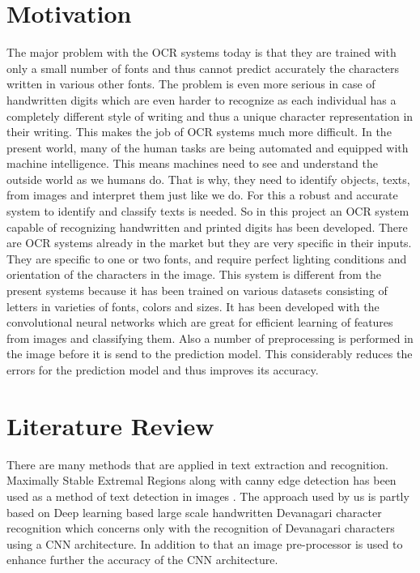 \section{Motivation}
The major problem with the OCR systems today is that they are trained with only a small number of fonts and thus cannot predict accurately the characters written in various other fonts. The problem is even more serious in case of handwritten digits which are even harder to recognize as each individual has a completely different style of writing and thus a unique character representation in their writing. This makes the job of OCR systems much more difficult. 
In the present world, many of the human tasks are being automated and equipped with machine intelligence. This means machines need to see and understand the outside world as we humans do. That is why, they need to identify objects, texts, from images and interpret them just like we do. For this a robust and accurate system to identify and classify texts is needed. So in this project an OCR system capable of recognizing handwritten and printed digits has been developed. 
There are OCR systems already in the market but they are very specific in their inputs. They are specific to one or two fonts, and require perfect lighting conditions and orientation of the characters in the image.
This system is different from the present systems because it has been trained on various datasets consisting of letters in varieties of fonts, colors and sizes. It has been developed with the convolutional neural networks which are great for efficient learning of features from images and classifying them. Also a number of preprocessing is performed in the image before it is send to the prediction model. This considerably reduces the errors for the prediction model and thus improves its accuracy.

\section{Literature Review}
There are many methods that are applied in text extraction and recognition. Maximally Stable Extremal Regions along with canny edge detection has been used as a method of text detection in images \autocite{Huang:2016:DAO:2964284.2967282}. The approach used by us is partly based on Deep learning based large scale handwritten Devanagari character recognition \autocite{ahok_deeplearn} which concerns only with the recognition of Devanagari characters using a CNN architecture. In addition to that an image pre-processor is used to enhance further the accuracy of the CNN architecture.

